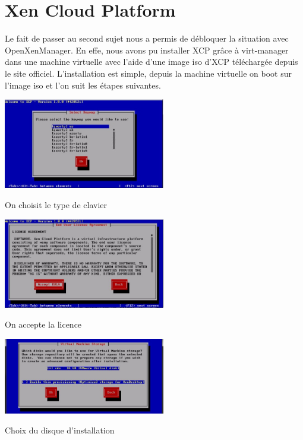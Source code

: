 \section{Xen Cloud Platform}
Le fait de passer au second sujet nous a permis de débloquer la situation avec OpenXenManager.
En effe, nous avons pu installer XCP grâce à virt-manager dans une machine virtuelle avec l'aide d'une image iso d'XCP téléchargée depuis le site officiel.
L'installation est simple, depuis la machine virtuelle on boot sur l'image iso et l'on suit les étapes suivantes.
\begin{center}
\includegraphics[width=200pt]{images/1.png}
\end{center}
\begin{center}
On choisit le  type de clavier
\end{center}
\begin{center}
\includegraphics[width=200pt]{images/2.png}
\end{center}
\begin{center}
On accepte la licence
\end{center}
\begin{center}
\includegraphics[width=200pt]{images/3.png}
\end{center}
\begin{center}
Choix du disque d'installation
\end{center}
